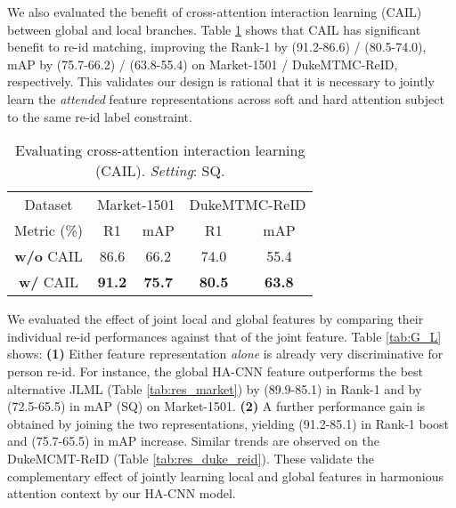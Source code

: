 \documentclass[10pt,twocolumn,letterpaper]{article}
\begin{document}
\vspace{0.02cm}
We also evaluated the benefit of cross-attention interaction learning (CAIL) between global and local branches. 
Table \ref{tab:res_hi} shows that CAIL has significant benefit to re-id matching,
improving the Rank-1 by (91.2-86.6) / (80.5-74.0),
mAP by (75.7-66.2) / (63.8-55.4) on Market-1501 / DukeMTMC-ReID, respectively.
This validates our design is rational that it is necessary to jointly learn
the {\em attended} feature representations across soft and hard attention
subject to the same re-id label constraint.
\vspace{-0.1cm}
\begin{table} [!t]
	\centering
\renewcommand{\arraystretch}{1.2}
	\setlength{\tabcolsep}{0.2 cm}
\caption{Evaluating cross-attention interaction learning (CAIL). {\em Setting}: SQ.
	}
	\vskip 1pt \begin{tabular}{|c|cc|cc|}
		\hline
		Dataset &  \multicolumn{2}{c|}{Market-1501} &
		\multicolumn{2}{c|}{DukeMTMC-ReID} \\ \cline{1-5}
		Metric (\%)    & R1 & mAP & R1 & mAP  \\ \hline \hline
{\bf w/o} CAIL &  86.6 &  66.2  &  74.0 &  55.4\\  
		\hline
		{\bf w/} CAIL & \bf 91.2 & \bf 75.7  & \bf 80.5 & \bf 63.8\\ 
		\hline
	\end{tabular}\label{tab:res_hi}
	\vspace{-0.4cm}
\end{table}


\vspace{0.01cm}
We evaluated the effect of joint local and global features by
comparing their individual re-id performances against that of the joint feature.
Table \ref{tab:G_L} shows: 
{\bf (1)} Either feature representation {\em alone} is already very
discriminative for person re-id. For instance, the global HA-CNN feature 
outperforms the best alternative JLML \cite{li2017person}
(Table \ref{tab:res_market}) by (89.9-85.1) in Rank-1 
and by (72.5-65.5) in mAP (SQ) on Market-1501.
{\bf (2)} A further performance gain is obtained by joining the two
representations, yielding (91.2-85.1) in Rank-1 boost and (75.7-65.5) in mAP increase.
Similar trends are observed on the DukeMCMT-ReID (Table \ref{tab:res_duke_reid}).
These validate the complementary effect of jointly learning
local and global features in harmonious attention context 
by our HA-CNN model. 
\end{document}

